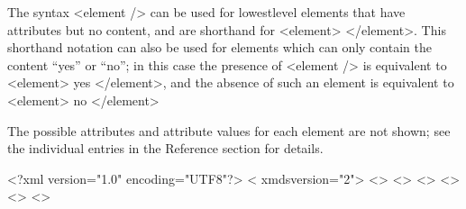 \documentclass[letterpaper,10pt,english]{sphinxmanual}
\begin{document}
\sphinxAtStartPar
The syntax \textless{}element /\textgreater{} can be used for lowest\sphinxhyphen{}level elements that have attributes but no content, and are shorthand for \textless{}element\textgreater{} \textless{}/element\textgreater{}. This shorthand notation can also be used for elements which can only contain the content “yes” or “no”; in this case the presence of \textless{}element /\textgreater{} is equivalent to \textless{}element\textgreater{} yes \textless{}/element\textgreater{}, and the absence of such an element is equivalent to \textless{}element\textgreater{} no \textless{}/element\textgreater{}

\sphinxAtStartPar
The possible attributes and attribute values for each element are not shown; see the individual entries in the Reference section for details.
\begin{sphinxalltt}
\textless{}?xml version="1.0" encoding="UTF\sphinxhyphen{}8"?\textgreater{}
\textless{}{\hyperref[\detokenize{reference_elements:simulationelement}]{}} xmds\sphinxhyphen{}version="2"\textgreater{}
  \textless{}{\hyperref[\detokenize{reference_elements:nameelement}]{}}\textgreater{} \textless{}{\hyperref[\detokenize{reference_elements:nameelement}]{}}\textgreater{}
  \textless{}{\hyperref[\detokenize{reference_elements:authorelement}]{}}\textgreater{} \textless{}{\hyperref[\detokenize{reference_elements:authorelement}]{}}\textgreater{}
  \textless{}{\hyperref[\detokenize{reference_elements:descriptionelement}]{}}\textgreater{} \textless{}{\hyperref[\detokenize{reference_elements:descriptionelement}]{}}\textgreater{}


\end{sphinxalltt}
\end{document}
